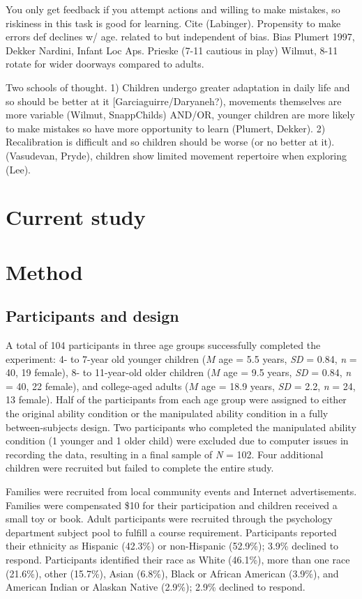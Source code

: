\documentclass[a4paper,man,natbib,floatsintext,noextraspace]{apa6}
\begin{document}
You only get feedback if you attempt actions and willing to make mistakes, so riskiness in this task is good for learning. Cite (Labinger). Propensity to make errors def declines w/ age. related to but independent of bias. Bias Plumert 1997, Dekker Nardini, Infant Loc Aps. Prieske (7-11 cautious in play) Wilmut, 8-11 rotate for wider doorways compared to adults. 

Two schools of thought. 1) Children undergo greater adaptation in daily life and so should be better at it [Garciaguirre/Daryaneh?), movements themselves are more variable (Wilmut, SnappChilds) AND/OR, younger children are more likely to make mistakes so have more opportunity to learn (Plumert, Dekker). 2) Recalibration is difficult and so children should be worse (or no better at it). (Vasudevan, Pryde), children show limited movement repertoire when exploring (Lee).

\section{Current study}


\section{Method}

\subsection{Participants and design}

A total of 104 participants in three age groups successfully completed the experiment: 4- to 7-year old younger children ($M$ age = 5.5 years, \textit{SD} = 0.84, \textit{n} = 40, 19 female), 8- to 11-year-old older children ($M$ age = 9.5 years, \textit{SD} = 0.84, \textit{n} = 40, 22 female), and college-aged adults ($M$ age = 18.9 years, \textit{SD} = 2.2, \textit{n} = 24, 13 female). Half of the participants from each age group were assigned to either the original ability condition or the manipulated ability condition in a fully between-subjects design. Two participants who completed the manipulated ability condition (1 younger and 1 older child) were excluded due to computer issues in recording the data, resulting in a final sample of \textit{N} = 102. Four additional children were recruited but failed to complete the entire study. 

Families were recruited from local community events and Internet advertisements. Families were compensated \$10 for their participation and children received a small toy or book. Adult participants were recruited through the psychology department subject pool to fulfill a course requirement. Participants reported their ethnicity as Hispanic (42.3\%) or non-Hispanic (52.9\%); 3.9\% declined to respond. Participants identified their race as White (46.1\%), more than one race (21.6\%), other (15.7\%), Asian (6.8\%), Black or African American (3.9\%), and American Indian or Alaskan Native (2.9\%); 2.9\% declined to respond.
\end{document}
